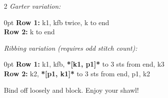 \documentclass[12pt]{article}
\newcommand{\rowDir}[1]{\textbf{#1:}} %
\renewcommand{\repeat}[1]{\textbf{*[#1]*}} %
\newenvironment{unframed}
    {%
	\begin{addmargin}[2em]{0pt}
	\small
	\setlength{\parindent}{-2em}}
    {\vspace{1em}
	\normalsize
	\end{addmargin}
	\setlength{\parindent}{0em}}
\begin{document}
\begin{multicols}{2}
\emph{Garter variation:}
\begin{unframed}
\rowDir{Row 1} k1, kfb twice, k to end \\
\rowDir{Row 2} k to end
\end{unframed}

\emph{Ribbing variation (requires odd stitch count):}
\begin{unframed}
\rowDir{Row 1} k1, kfb, \repeat{k1, p1} to 3 sts from end, k3 \\
\rowDir{Row 2} k2, \repeat{p1, k1} to 3 sts from end, p1, k2 
\end{unframed}

Bind off loosely and block. Enjoy your shawl!
\end{multicols}
\end{document}
